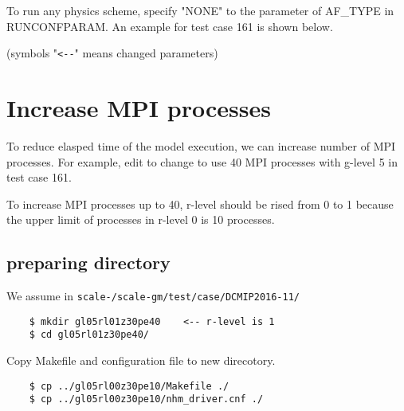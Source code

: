 
 \noindent To run any physics scheme, specify "NONE" to the parameter
 of AF\_TYPE in RUNCONFPARAM.
 An example for test case 161 is shown below.

 (symbols "\verb|<--|" means changed parameters)



\section{Increase MPI processes}
 \noindent To reduce elasped time of the model execution, we can increase
 number of MPI processes. For example, edit to change to use 40 MPI processes
 with g-level 5 in test case 161.

 To increase MPI processes up to 40, r-level should be rised from 0 to 1
 because the upper limit of processes in r-level 0 is 10 processes.

\subsection{preparing directory}
 We assume in \texttt{scale-{\version}/scale-gm/test/case/DCMIP2016-11/}
 \begin{verbatim}
    $ mkdir gl05rl01z30pe40    <-- r-level is 1
    $ cd gl05rl01z30pe40/
 \end{verbatim}

 \noindent Copy Makefile and configuration file to new direcotory.
 \begin{verbatim}
    $ cp ../gl05rl00z30pe10/Makefile ./
    $ cp ../gl05rl00z30pe10/nhm_driver.cnf ./
 \end{verbatim}

